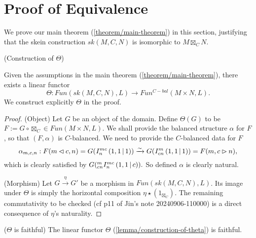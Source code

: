 \section{Proof of Equivalence}\label{section/proof-of-equivalence}

We prove our main theorem (\ref{theorem/main-theorem}) in this section, justifying that the skein construction $sk(M,C,N)$ is isomorphic to $M \boxtimes_{C} N$.

\begin{lemma}\label{lemma/construction-of-theta} (Construction of $\Theta$)

  \noindent Given the assumptions in the main theorem (\ref{theorem/main-theorem}), there exists a linear functor
  \[
    \Theta: Fun(sk(M,C,N), L) \to Fun^{C-bal}(M \times N, L).
  \]
  We construct explicitly $\Theta$ in the proof.
\end{lemma}

\begin{proof}
  \noindent (Object) Let $G$ be an object of the domain. Define $\Theta(G)$ to
  be $F := G \circ \boxtimes_{C} \in Fun(M \times N, L)$. We shall provide the
  balanced structure $\alpha$ for $F$, so that $(F, \alpha)$ is $C$-balanced. 
  We need to provide the $C$-balanced data for $F$
  \[
    \alpha_{m,c,n}: F(m \lhd c, n) = G({}^{}_{} I^{mc}_{n} \left( 1, 1 \,\middle|\, 1 \right)) \xrightarrow{\sim} G({}^{}_{} I^{m}_{cn} \left( 1, 1 \,\middle|\, 1 \right)) = F(m, c \rhd n),
  \]
  which is clearly satisfied by $G({}^{m}_{cn} I^{mc}_{n} \left( 1, 1 \,\middle|\, c \right)).$ So defined $\alpha$ is clearly natural.

  \noindent (Morphism) Let $G \xrightarrow{\eta} G'$ be a morphism in
  $Fun(sk(M,C,N), L)$. Its image under $\Theta$ is simply the horizontal
  composition $\eta \star (1_{\boxtimes_{C}})$. The remaining commutativity to
  be checked (cf p11 of Jin's note 20240906-110000) is a direct consequence of
  $\eta$'s naturality.
\end{proof}

\begin{lemma}\label{lemma/theta-is-faithful} ($\Theta$ is faithful) The linear
  functor $\Theta$ (\ref{lemma/construction-of-theta}) is faithful.
\end{lemma}


